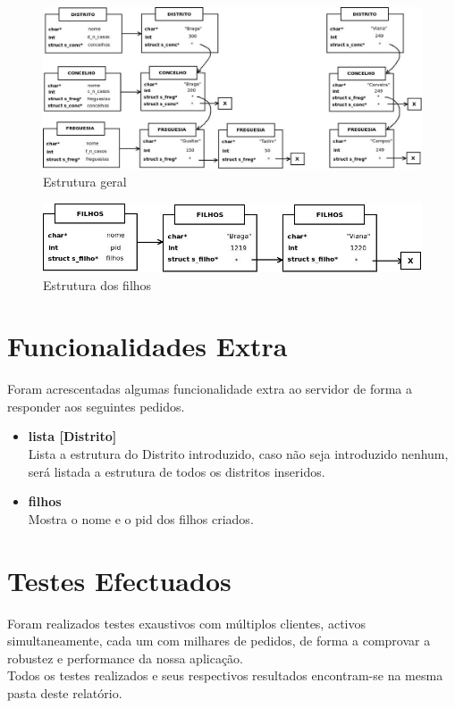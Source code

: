 \documentclass[10pt,notitlepage]{article}
\begin{document}
\begin{figure}[h]
\centering
\includegraphics[scale=0.45]{StructsDistConcFreg.jpeg}
\caption{Estrutura geral}
\end{figure}



\begin{figure}[h]
\centering
\includegraphics[scale=0.45]{StructsFilhos.jpeg}
\caption{Estrutura dos filhos}
\end{figure}

\section{Funcionalidades Extra}

Foram acrescentadas algumas funcionalidade extra ao servidor de forma a responder aos seguintes pedidos.

\begin{itemize}
\item \textbf{lista [Distrito]}\\
Lista a estrutura do Distrito introduzido, caso não seja introduzido nenhum, será listada a estrutura de todos os distritos inseridos.
\item \textbf{filhos}\\
Mostra o nome e o pid dos filhos criados.
\end{itemize}


\section{Testes Efectuados}

Foram realizados testes exaustivos com múltiplos clientes, activos simultaneamente, cada um com milhares de pedidos, de forma a comprovar a robustez e performance da nossa aplicação.\\
Todos os testes realizados e seus respectivos resultados encontram-se na mesma pasta deste relatório.
\end{document}
